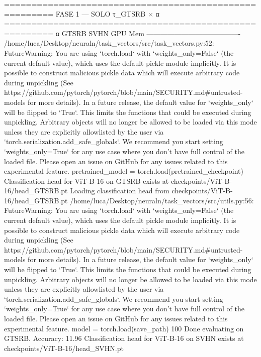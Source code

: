 =======================================================
  FASE 1 — SOLO τ_GTSRB × α
=======================================================
  α             GTSRB     SVHN    GPU Mem
  ----------------------------------------
/home/luca/Desktop/neuraln/task_vectors/src/task_vectors.py:52: FutureWarning: You are using `torch.load` with `weights_only=False` (the current default value), which uses the default pickle module implicitly. It is possible to construct malicious pickle data which will execute arbitrary code during unpickling (See https://github.com/pytorch/pytorch/blob/main/SECURITY.md#untrusted-models for more details). In a future release, the default value for `weights_only` will be flipped to `True`. This limits the functions that could be executed during unpickling. Arbitrary objects will no longer be allowed to be loaded via this mode unless they are explicitly allowlisted by the user via `torch.serialization.add_safe_globals`. We recommend you start setting `weights_only=True` for any use case where you don't have full control of the loaded file. Please open an issue on GitHub for any issues related to this experimental feature.
  pretrained_model = torch.load(pretrained_checkpoint)
Classification head for ViT-B-16 on GTSRB exists at checkpoints/ViT-B-16/head_GTSRB.pt
Loading classification head from checkpoints/ViT-B-16/head_GTSRB.pt
/home/luca/Desktop/neuraln/task_vectors/src/utils.py:56: FutureWarning: You are using `torch.load` with `weights_only=False` (the current default value), which uses the default pickle module implicitly. It is possible to construct malicious pickle data which will execute arbitrary code during unpickling (See https://github.com/pytorch/pytorch/blob/main/SECURITY.md#untrusted-models for more details). In a future release, the default value for `weights_only` will be flipped to `True`. This limits the functions that could be executed during unpickling. Arbitrary objects will no longer be allowed to be loaded via this mode unless they are explicitly allowlisted by the user via `torch.serialization.add_safe_globals`. We recommend you start setting `weights_only=True` for any use case where you don't have full control of the loaded file. Please open an issue on GitHub for any issues related to this experimental feature.
  model = torch.load(save_path)
100%
Done evaluating on GTSRB. Accuracy: 11.96%
Classification head for ViT-B-16 on SVHN exists at checkpoints/ViT-B-16/head_SVHN.pt
